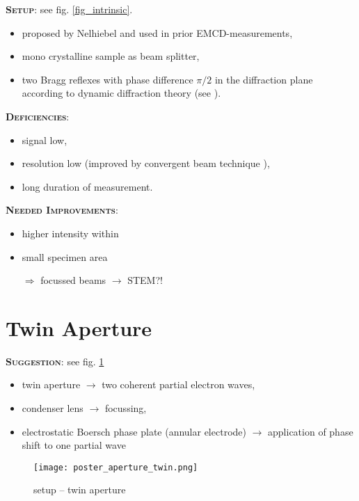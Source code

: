 \documentclass[portrait]{sciposter}
\begin{document}
\begin{multicols}{3}
\textbf{\scshape Setup}: see fig. \ref{fig_intrinsic}.
\begin{itemize}
\item proposed by Nelhiebel \cite{emcd_intrinsic} and used in prior EMCD-measurements\cite{emcd_nature,pd_rubino,pd_hurm},
\item mono crystalline sample as beam splitter,
\item two Bragg reflexes with phase difference $\pi/2$ in the diffraction plane according to dynamic diffraction theory (see \cite{pd_rubino,pd_hurm}).
\end{itemize}

\textbf{\scshape Deficiencies}:
\begin{itemize}
\item signal low,
\item resolution low (improved by convergent beam technique \cite{mcd_in_eels_2}),
\item long duration of measurement.
\end{itemize}

\textbf{\scshape Needed Improvements}:
\begin{itemize}
\item higher intensity within
\item small specimen area
\item[$\Rightarrow$] focussed beams $\to$ STEM?!
\end{itemize}

\section{Twin Aperture}
\textbf{\scshape Suggestion}: see fig. \ref{fig_twin}
\begin{itemize}
\item twin aperture $\to$ two coherent partial electron waves,
\item condenser lens $\to$ focussing,
\item electrostatic Boersch phase plate (annular electrode) \cite{phaseplate} $\to$ application of phase shift to one partial wave
\end{itemize}

\begin{figure}[h]
\begin{center}
\label{fig_twin}
\texttt{[image: poster\_aperture\_twin.png]}
\end{center}
\caption{setup -- twin aperture}
\end{figure}


\end{multicols}
\end{document}

